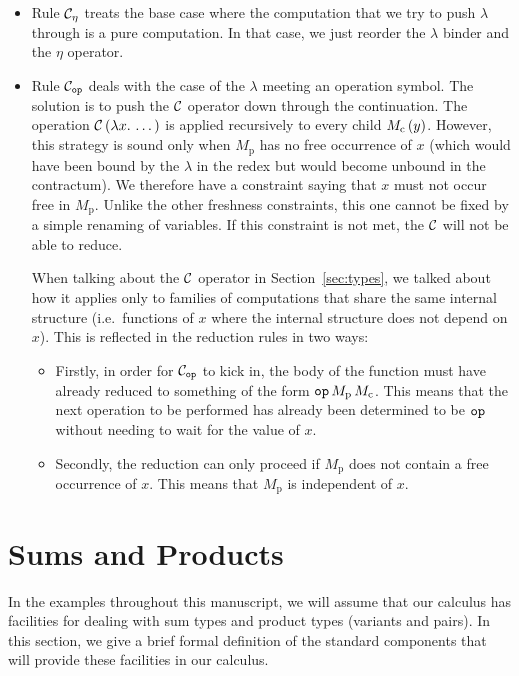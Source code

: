 \begin{itemize}
\item Rule $\mathcal{C}_\eta$ treats the base case where the computation that we
  try to push $\lambda$ through is a pure computation. In that case, we
  just reorder the $\lambda$ binder and the $\eta$ operator.

\item Rule $\mathcal{C}_{\mathtt{op}}$ deals with the case of the $\lambda$ meeting an
  operation symbol. The solution is to push the $\mathcal{C}$ operator down through
  the continuation. The operation $\mathcal{C}\,(\lambda x.\, \dots)$ is applied
  recursively to every child $M_{\mathrm{c}}\,(y)$. However, this
  strategy is sound only when $M_{\mathrm{p}}$ has no free occurrence of
  $x$ (which would have been bound by the $\lambda$ in the redex but would
  become unbound in the contractum). We therefore have a constraint saying
  that $x$ must not occur free in $M_{\mathrm{p}}$. Unlike the other
  freshness constraints, this one cannot be fixed by a simple renaming of
  variables. If this constraint is not met, the $\mathcal{C}$ will not be able to
  reduce.

  When talking about the $\mathcal{C}$ operator in Section~\ref{sec:types}, we
  talked about how it applies only to families of computations that share
  the same internal structure (i.e.\ functions of $x$ where the internal
  structure does not depend on $x$). This is reflected in the reduction
  rules in two ways:
  \begin{itemize}
  \item Firstly, in order for $\mathcal{C}_{\mathtt{op}}$ to kick in, the body of the
    function must have already reduced to something of the form
    $\mathtt{op}\,M_{\mathrm{p}}\,M_{\mathrm{c}}$. This means that
    the next operation to be performed has already been determined to be
    $\mathtt{op}$ without needing to wait for the value of $x$.
  \item Secondly, the reduction can only proceed if $M_{\mathrm{p}}$ does
    not contain a free occurrence of $x$. This means that $M_{\mathrm{p}}$
    is independent of $x$.
  \end{itemize}
\end{itemize}


\section{Sums and Products}
\label{sec:sums-and-products}

In the examples throughout this manuscript, we will assume that our
calculus has facilities for dealing with sum types and product types
(variants and pairs). In this section, we give a brief formal definition of
the standard components that will provide these facilities in our calculus.


